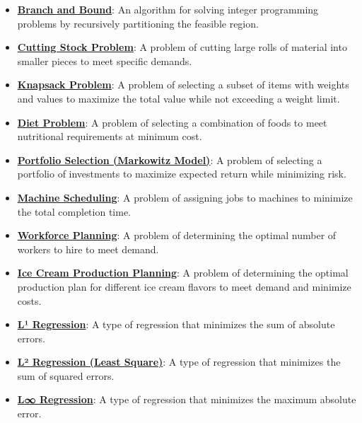 \documentclass{article}%
\begin{document}
\begin{itemize}[leftmargin=*]
\item \href{https://www.math.purdue.edu/~yipn/421/2024-11-14-NetAppls.pdf#page=7}{\textbf{Branch and Bound}}: An algorithm for solving integer programming problems by recursively partitioning the feasible region.%
\item \href{https://www.math.purdue.edu/~yipn/421/2024-11-14-NetAppls.pdf#page=7}{\textbf{Cutting Stock Problem}}: A problem of cutting large rolls of material into smaller pieces to meet specific demands.%
\item \href{https://www.math.purdue.edu/~yipn/421/2024-11-14-NetAppls.pdf#page=7}{\textbf{Knapsack Problem}}: A problem of selecting a subset of items with weights and values to maximize the total value while not exceeding a weight limit.%
\item \href{https://www.math.purdue.edu/~yipn/421/2024-11-14-NetAppls.pdf#page=7}{\textbf{Diet Problem}}: A problem of selecting a combination of foods to meet nutritional requirements at minimum cost.%
\item \href{https://www.math.purdue.edu/~yipn/421/2024-11-14-NetAppls.pdf#page=7}{\textbf{Portfolio Selection (Markowitz Model)}}: A problem of selecting a portfolio of investments to maximize expected return while minimizing risk.%
\item \href{https://www.math.purdue.edu/~yipn/421/2024-11-14-NetAppls.pdf#page=7}{\textbf{Machine Scheduling}}: A problem of assigning jobs to machines to minimize the total completion time.%
\item \href{https://www.math.purdue.edu/~yipn/421/2024-11-14-NetAppls.pdf#page=7}{\textbf{Workforce Planning}}: A problem of determining the optimal number of workers to hire to meet demand.%
\item \href{https://www.math.purdue.edu/~yipn/421/2024-11-14-NetAppls.pdf#page=7}{\textbf{Ice Cream Production Planning}}: A problem of determining the optimal production plan for different ice cream flavors to meet demand and minimize costs.%
\item \href{https://www.math.purdue.edu/~yipn/421/2024-11-14-NetAppls.pdf#page=7}{\textbf{L¹ Regression}}: A type of regression that minimizes the sum of absolute errors.%
\item \href{https://www.math.purdue.edu/~yipn/421/2024-11-14-NetAppls.pdf#page=7}{\textbf{L² Regression (Least Square)}}: A type of regression that minimizes the sum of squared errors.%
\item \href{https://www.math.purdue.edu/~yipn/421/2024-11-14-NetAppls.pdf#page=7}{\textbf{L∞ Regression}}: A type of regression that minimizes the maximum absolute error.%

\end{itemize}
\end{document}
